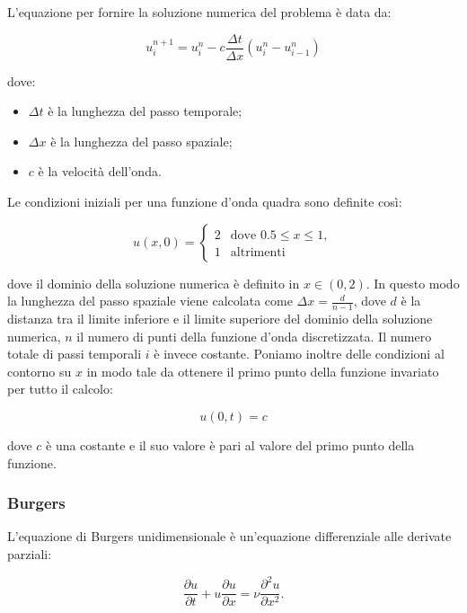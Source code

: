 \noindent
L’equazione per fornire la soluzione numerica del problema è data da:

\begin{equation}
u_i^{n+1} = u_i^n - c \frac{\Delta t}{\Delta x}(u_i^n-u_{i-1}^n)
\end{equation}

\noindent
dove:
\begin{itemize}
\item $\Delta t$ è la lunghezza del passo temporale;
\item $\Delta x$ è la lunghezza del passo spaziale;
\item $c$ è la velocità dell'onda.
\end{itemize}


\noindent
Le condizioni iniziali per una funzione d’onda quadra sono definite così:

\begin{equation}
u(x,0)=\begin{cases}2 & \text{dove } 0.5\leq x \leq 1,\\
1 & \text{altrimenti} 
\end{cases}
\end{equation}

\noindent
dove il dominio della soluzione numerica è definito in $x\in(0,2)$. In questo modo la lunghezza del passo spaziale viene calcolata come $\Delta x = \frac{d}{n - 1}$, dove $d$ è la distanza tra il limite inferiore e il limite superiore del dominio della soluzione numerica, $n$ il numero di punti della funzione d'onda discretizzata. Il numero totale di passi temporali $i$ è invece costante.
\noindent
Poniamo inoltre delle condizioni al contorno su $x$ in modo tale da ottenere il primo punto della funzione invariato per tutto il calcolo:

\begin{equation}
u(0,t) = c 
\end{equation}

\noindent
dove $c$ è una costante e il suo valore è pari al valore del primo punto della funzione.

\subsubsection*{Burgers}
L’equazione di Burgers unidimensionale è un’equazione differenziale alle derivate parziali: 

\begin{equation}
\frac{\partial u}{\partial t} + u \frac{\partial u}{\partial x} = \nu \frac{\partial ^2u}{\partial x^2}.
\end{equation}

